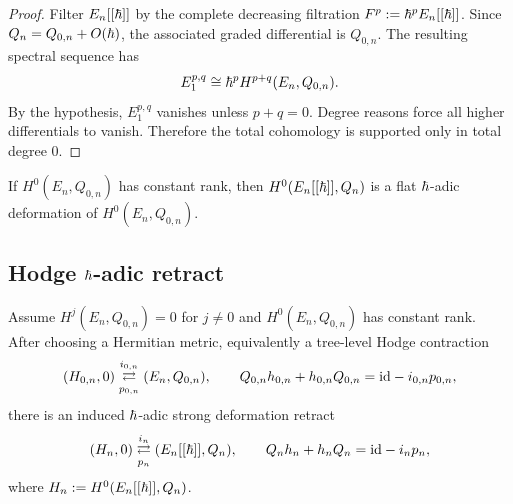 \begin{proof}
Filter $E_n[[\hbar]]$ by the complete decreasing filtration $F^p:=\hbar^pE_n[[\hbar]]$. Since $Q_n=Q_{0,n}+O(\hbar)$, the associated graded differential is $Q_{0,n}$. The resulting spectral sequence has
\[
 E_1^{p,q}\cong \hbar^p H^{p+q}(E_n,Q_{0,n}).
\]
By the hypothesis, $E_1^{p,q}$ vanishes unless $p+q=0$. Degree reasons force all higher differentials to vanish. Therefore the total cohomology is supported only in total degree $0$.
\end{proof}

\begin{corollary}\label{cor:flat-hbar}
If $H^0(E_n,Q_{0,n})$ has constant rank, then $H^0(E_n[[\hbar]],Q_n)$ is a flat $\hbar$-adic deformation of $H^0(E_n,Q_{0,n})$.
\end{corollary}

\subsection{Hodge $\hbar$-adic retract}

\begin{theorem}\label{thm:hodge-hbar-retract}
Assume $H^j(E_n,Q_{0,n})=0$ for $j\neq 0$ and $H^0(E_n,Q_{0,n})$ has constant rank. After choosing a Hermitian metric, equivalently a tree-level Hodge contraction
\[
 (H_{0,n},0)\underset{p_{0,n}}{\stackrel{i_{0,n}}{\rightleftarrows}}(E_n,Q_{0,n}),
 \qquad
 Q_{0,n}h_{0,n}+h_{0,n}Q_{0,n}=\mathrm{id}-i_{0,n}p_{0,n},
\]
there is an induced $\hbar$-adic strong deformation retract
\[
 (H_n,0) \underset{p_n}{\stackrel{i_n}{\rightleftarrows}} (E_n[[\hbar]],Q_n),
 \qquad
 Q_n h_n+h_nQ_n = \mathrm{id} - i_np_n,
\]
where $H_n:=H^0(E_n[[\hbar]],Q_n)$.
\end{theorem}

